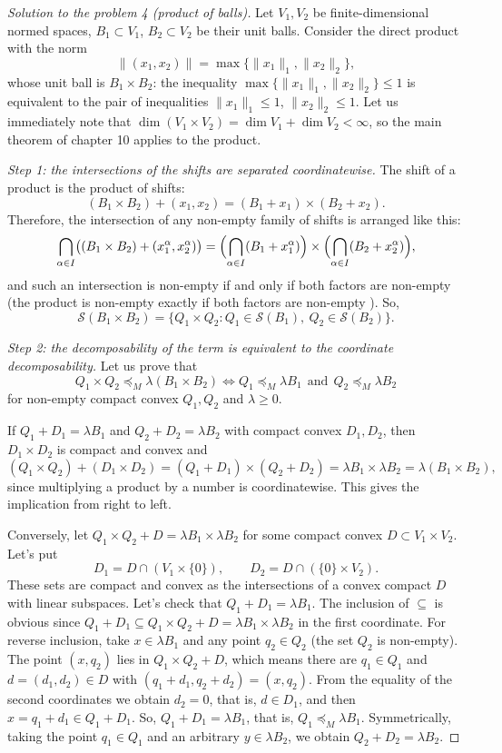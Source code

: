 \documentclass[a4paper,12pt]{report}
\begin{document}
\begin{proof}[Solution to the problem \textup{4} \textup{(}product of balls\textup{)}]

Let $V_1,V_2$ be finite-dimensional normed spaces, $B_1\subset V_1$, $B_2\subset V_2$ be their unit balls. Consider the direct product with the norm
\[
\|(x_1,x_2)\|=\max\{\|x_1\|_1,\|x_2\|_2\},
\]
whose unit ball is $B_1\times B_2$: the inequality $\max\{\|x_1\|_1,\|x_2\|_2\}\le1$ is equivalent to the pair of inequalities $\|x_1\|_1\le1$, $\|x_2\|_2\le1$. Let us immediately note that $\dim(V_1\times V_2)=\dim V_1+\dim V_2<\infty$, so the main theorem of chapter \textup{10} applies to the product.

\textit{Step \textup{1}\textup{:} the intersections of the shifts are separated coordinatewise.} The shift of a product is the product of shifts\textup{:}
\[
(B_1\times B_2)+(x_1,x_2)=(B_1+x_1)\times(B_2+x_2).
\]
Therefore, the intersection of any non-empty family of shifts is arranged like this\textup{:}
\[
\bigcap_{\alpha\in I}\bigl((B_1\times B_2)+(x_1^\alpha,x_2^\alpha)\bigr)
=\Bigl(\bigcap_{\alpha\in I}(B_1+x_1^\alpha)\Bigr)\times\Bigl(\bigcap_{\alpha\in I}(B_2+x_2^\alpha)\Bigr),
\]
and such an intersection is non-empty if and only if both factors are non-empty \textup{(}the product is non-empty exactly if both factors are non-empty \textup{)}. So,
\[
\mathcal S(B_1\times B_2)=\{Q_1\times Q_2: Q_1\in\mathcal S(B_1),\ Q_2\in\mathcal S(B_2)\} .
\]

\textit{Step \textup{2}\textup{:} the decomposability of the term is equivalent to the coordinate decomposability.} Let us prove that
\[
Q_1\times Q_2\preceq_M\lambda(B_1\times B_2)\iff Q_1\preceq_M\lambda B_1\ \ \text{and}\ \ Q_2\preceq_M\lambda B_2
\]
for non-empty compact convex $Q_1,Q_2$ and $\lambda\ge0$.

If $Q_1+D_1=\lambda B_1$ and $Q_2+D_2=\lambda B_2$ with compact convex $D_1,D_2$, then $D_1\times D_2$ is compact and convex and
\[
(Q_1\times Q_2)+(D_1\times D_2)=(Q_1+D_1)\times(Q_2+D_2)=\lambda B_1\times\lambda B_2=\lambda(B_1\times B_2),
\]
since multiplying a product by a number is coordinatewise. This gives the implication from right to left.

Conversely, let $Q_1\times Q_2+D=\lambda B_1\times\lambda B_2$ for some compact convex $D\subset V_1\times V_2$. Let's put
\[
D_1=D\cap(V_1\times\{0\}),\qquad D_2=D\cap(\{0\}\times V_2).
\]
These sets are compact and convex as the intersections of a convex compact $D$ with linear subspaces. Let's check that $Q_1+D_1=\lambda B_1$. The inclusion of $\subseteq$ is obvious since $Q_1+D_1\subseteq Q_1\times Q_2+D=\lambda B_1\times\lambda B_2$ in the first coordinate. For reverse inclusion, take $x\in\lambda B_1$ and any point $q_2\in Q_2$ \textup{(}the set $Q_2$ is non-empty\textup{)}. The point $(x,q_2)$ lies in $Q_1\times Q_2+D$, which means there are $q_1\in Q_1$ and $d=(d_1,d_2)\in D$ with $(q_1+d_1,q_2+d_2)=(x,q_2)$. From the equality of the second coordinates we obtain $d_2=0$, that is, $d\in D_1$, and then $x=q_1+d_1\in Q_1+D_1$. So, $Q_1+D_1=\lambda B_1$, that is, $Q_1\preceq_M\lambda B_1$. Symmetrically, taking the point $q_1\in Q_1$ and an arbitrary $y\in\lambda B_2$, we obtain $Q_2+D_2=\lambda B_2$.


\end{proof}
\end{document}
